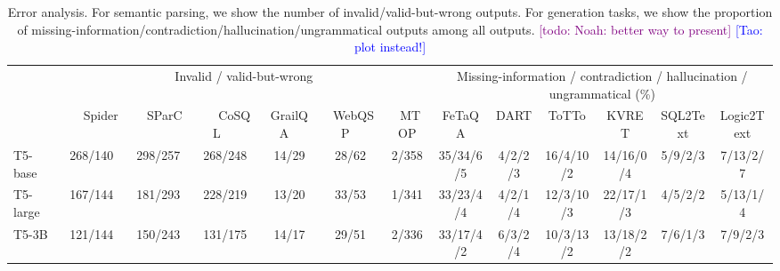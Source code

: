 \documentclass[11pt]{article}
\newcommand{\todo}[1]{\textcolor{purple}{[todo: #1]}}
\newcommand{\tao}[1]{\textcolor{blue}{[Tao: #1]}}
\newcommand{\ziyu}[1]{\textcolor{magenta}{\bf\small [Ziyu: #1]}}
\begin{document}
\iffalse
\begin{figure}[t]
\centering
    \subfigure[FeTaQA]{
        \texttt{[image: figures/human\_and\_error/FeTaQA-human.pdf]}
    }
    \subfigure[DART]{
        \texttt{[image: figures/human\_and\_error/DART-human.pdf]}
    }
    \subfigure[ToTTo]{
        \texttt{[image: figures/human\_and\_error/ToTTo-human.pdf]}
    }
    \subfigure[KVRET]{
        \texttt{[image: figures/human\_and\_error/KVRET-human.pdf]}
    }
    \subfigure[SQL2Text]{
        \texttt{[image: figures/human\_and\_error/SQL2Text-human.pdf]}
    }
    \subfigure[Logic2Text]{
        \texttt{[image: figures/human\_and\_error/Logic2Text-human.pdf]}
    }
\caption{\label{fig:human-eval} Development set performance measured by automatic metrics and human for generation tasks. Generation metrics do not always reflect human evaluation. Larger models are not always better. Human evaluation statistical test: 1) on FeTaQA and SQL2Text, we have  for ``the rank-1 model is better than the rank-2 model''; 2) on FeTaQA, KVRET, and Logic2Text, we have  for ``the rank-2 model is better than the rank-3 model''.
\ziyu{larger font size in figures?}
\tao{take too much space to show a non-key discussion}
}
\end{figure}
\fi \iffalse
\begin{table*}[t]
	\centering
	\small
	\begin{adjustbox}{width=\linewidth}
	\begin{tabular}{@{}l@{}c@{}c@{}c@{}c@{}c@{}ccccccc@{}}
			\toprule
			& \multicolumn{6}{c}{Invalid / valid-but-wrong} & \multicolumn{6}{c}{Missing-information / contradiction / hallucination / ungrammatical (\%)} \\ 
		    \cmidrule(lr){2-7} \cmidrule(l){8-13}
			& \ \ \  Spider \ \ \ & \ \ SParC \ \ & \ \ \ CoSQL \ \ & GrailQA \ & \ WebQSP \ & \ MTOP & FeTaQA & DART & ToTTo & KVRET & SQL2Text & Logic2Text \\ 
			\midrule 
			T5-base       & 268/140 & 298/257 & 268/248 & 14/29 & 28/62 & 2/358 & 35/34/6/5 & 4/2/2/3 & 16/4/10/2 & 14/16/0/4 & 5/9/2/3 & 7/13/2/7 \\
			T5-large      & 167/144 & 181/293 & 228/219 & 13/20 & 33/53 & 1/341 & 33/23/4/4 & 4/2/1/4 & 12/3/10/3 & 22/17/1/3 & 4/5/2/2 & 5/13/1/4 \\
			T5-3B         & 121/144 & 150/243 & 131/175 & 14/17 & 29/51 & 2/336 & 33/17/4/2 & 6/3/2/4 & 10/3/13/2 & 13/18/2/2 & 7/6/1/3 & 7/9/2/3 \\ 
			\bottomrule
	\end{tabular}
	\end{adjustbox}
	\caption{Error analysis. For semantic parsing, we show the number of invalid/valid-but-wrong outputs. For generation tasks, we show the proportion of missing-information/contradiction/hallucination/ungrammatical outputs among all outputs. \todo{Noah: better way to present} \tao{plot instead!} }
	\label{tab:error_distribution}
\end{table*}
\fi 
\end{document}
